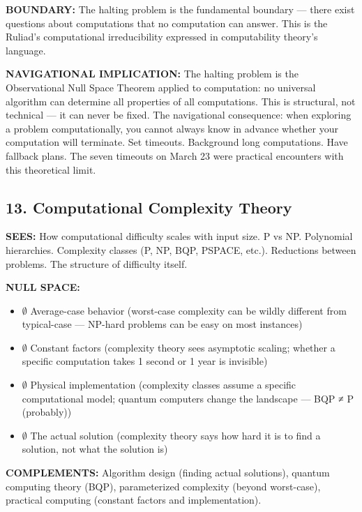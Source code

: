 \textbf{BOUNDARY:} The halting problem is the fundamental boundary — there exist questions about computations that no computation can answer. This is the Ruliad's computational irreducibility expressed in computability theory's language.


\textbf{NAVIGATIONAL IMPLICATION:} The halting problem is the Observational Null Space Theorem applied to computation: no universal algorithm can determine all properties of all computations. This is structural, not technical — it can never be fixed. The navigational consequence: when exploring a problem computationally, you cannot always know in advance whether your computation will terminate. Set timeouts. Background long computations. Have fallback plans. The seven timeouts on March 23 were practical encounters with this theoretical limit.


\bigskip\noindent\makebox[\textwidth]{\color{rulegray}\rule{5cm}{0.3pt}}\bigskip


\subsection*{13. Computational Complexity Theory}


\textbf{SEES:} How computational difficulty scales with input size. P vs NP. Polynomial hierarchies. Complexity classes (P, NP, BQP, PSPACE, etc.). Reductions between problems. The structure of difficulty itself.


\textbf{NULL SPACE:}

\begin{itemize}[nosep,leftmargin=*]
  \item $\emptyset$ Average-case behavior (worst-case complexity can be wildly different from typical-case — NP-hard problems can be easy on most instances)
  \item $\emptyset$ Constant factors (complexity theory sees asymptotic scaling; whether a specific computation takes 1 second or 1 year is invisible)
  \item $\emptyset$ Physical implementation (complexity classes assume a specific computational model; quantum computers change the landscape — BQP ≠ P (probably))
  \item $\emptyset$ The actual solution (complexity theory says how hard it is to find a solution, not what the solution is)
\end{itemize}


\textbf{COMPLEMENTS:} Algorithm design (finding actual solutions), quantum computing theory (BQP), parameterized complexity (beyond worst-case), practical computing (constant factors and implementation).


